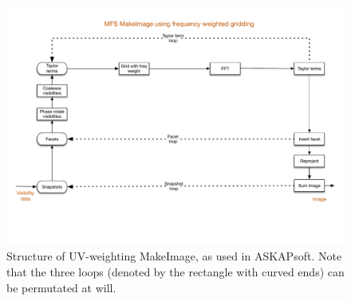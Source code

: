 \documentclass[11pt,a4paper,variablewidth]{article}
\begin{document}
\begin{figure}[htb]
  \centering
  \includegraphics[width=\textwidth]{./MSMFS_MakeImage_UV.pdf}
  \caption{Structure of UV-weighting MakeImage, as used in ASKAPsoft. Note that the three loops (denoted by the rectangle with curved ends) can be permutated at will.}
  \label{fig:predictimage}
\end{figure}




\clearpage
\end{document}
